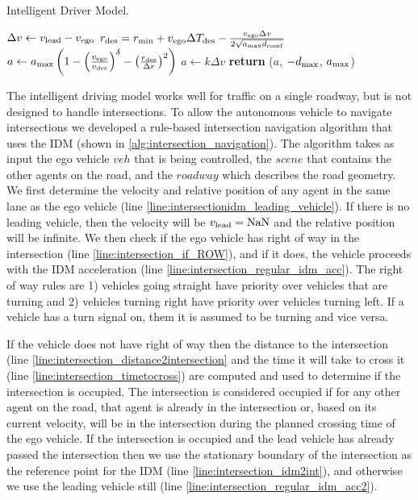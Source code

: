  \begin{algorithm}
\caption{Intelligent Driver Model.}
    \label{alg:idm}
\begin{algorithmic}[1]
    \State $\Delta v \gets v_{\rm lead} - v_{\rm ego}$
     \label{line:idm_has_lead}
        \State $r_{\rm des} = r_{\rm min} + v_{\rm ego} \Delta T_{\rm des} - \frac{v_{\rm ego} \Delta v}{2 \sqrt{a_{\rm max} d_{\rm comf}}}$ \label{line:idm_compute_desired}
        \State $a \gets a_{\rm max} \left( 1 - \left(\frac{v_{\rm ego}}{v_{\rm des}} \right)^{\delta} - \left( \frac{r _{\rm des}}{\Delta r} \right)^2 \right)$ \label{line:idm_compute_acc}
    \Else \label{line:idm_nolead}
        \State $a \gets k \Delta v$ \label{line:idm_compute_acc_free}
    \EndIf
    \State \textbf{return} ($a$, $-d_{\rm max}$, $a_{\rm max}$) \label{line:idm_clamp_acc}
    \EndFunction
\end{algorithmic}
\end{algorithm}


The intelligent driving model works well for traffic on a single roadway, but is not designed to handle intersections. To allow the autonomous vehicle to navigate intersections we developed a rule-based intersection navigation algorithm that uses the IDM (shown in \cref{alg:intersection_navigation}). The algorithm takes as input the ego vehicle $veh$ that is being controlled, the $scene$ that contains the other agents on the road, and the $roadway$ which describes the road geometry. We first determine the velocity and relative position of any agent in the same lane as the ego vehicle (line \ref{line:intersectionidm_leading_vehicle}). 
If there is no leading vehicle, then the velocity will be $v_{\rm lead} = {\rm NaN}$ and the relative position will be infinite. We then check if the ego vehicle has right of way in the intersection (line \ref{line:intersection_if_ROW}), and if it does, the vehicle proceeds with the IDM acceleration (line \ref{line:intersection_regular_idm_acc}). The right of way rules are 1) vehicles going straight have priority over vehicles that are turning and 2) vehicles turning right have priority over vehicles turning left. If a vehicle has a turn signal on, them it is assumed to be turning and vice versa. 

If the vehicle does not have right of way then the distance to the intersection (line \ref{line:intersection_distance2intersection} and the time it will take to cross it (line \ref{line:intersection_timetocross}) are computed and used to determine if the intersection is occupied. The intersection is considered occupied if for any other agent on the road, that agent is already in the intersection or, based on its current velocity, will be in the intersection during the planned crossing time of the ego vehicle. If the intersection is occupied and the lead vehicle has already passed the intersection then we use the stationary boundary of the intersection as the reference point for the IDM (line \ref{line:intersection_idm2int}), and otherwise we use the leading vehicle still (line \ref{line:intersection_regular_idm_acc2}).


